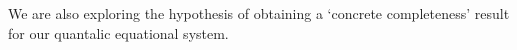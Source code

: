 \documentclass[a4paper,UKenglish,cleveref, autoref, thm-restate]{lipics-v2021}
\begin{document}
We are also exploring the hypothesis of obtaining a `concrete completeness'
result for our quantalic equational system.

%
%
%
%
%
%
%
\end{document}
